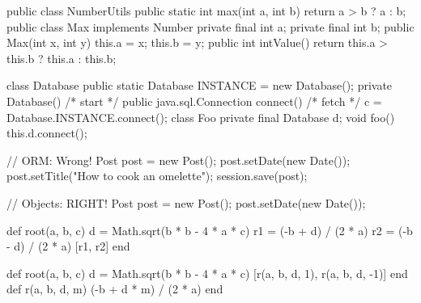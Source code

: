 \documentclass{article}
\begin{document}
\begin{lnSnippet}
public class NumberUtils {
  public static int max(int a, int b) {
    return a > b ? a : b;
  }
}
public class Max implements Number {
  private final int a;
  private final int b;
  public Max(int x, int y) { this.a = x; this.b = y; }
  public int intValue() {
    return this.a > this.b ? this.a : this.b;
  }
}
\end{lnSnippet}

\begin{lnSnippet}
class Database {
  public static Database INSTANCE = new Database();
  private Database() {  /* start */ }
  public java.sql.Connection connect() { /* fetch */ }
}
c = Database.INSTANCE.connect();
class Foo {
  private final Database d;
  void foo() {
    this.d.connect();
  }
}
\end{lnSnippet}

\begin{lnSnippet}
// ORM: Wrong!
Post post = new Post();
post.setDate(new Date());
post.setTitle("How to cook an omelette");
session.save(post);

// Objects: RIGHT!
Post post = new Post();
post.setDate(new Date());
\end{lnSnippet}



\begin{lnSnippet}[extract.rb]
def root(a, b, c)
  d = Math.sqrt(b * b - 4 * a * c)
  r1 = (-b + d) / (2 * a)
  r2 = (-b - d) / (2 * a)
  [r1, r2]
end

def root(a, b, c)
  d = Math.sqrt(b * b - 4 * a * c)
  [r(a, b, d, 1), r(a, b, d, -1)]
end
def r(a, b, d, m)
  (-b + d * m) / (2 * a)
end
\end{lnSnippet}
\end{document}
